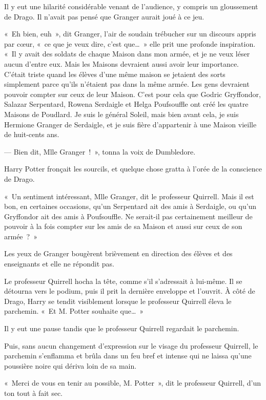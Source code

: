 Il y eut une hilarité considérable venant de l'audience, y compris un gloussement de Drago. Il n'avait pas pensé que Granger aurait joué à ce jeu.

«~Eh bien, euh~», dit Granger, l'air de soudain trébucher sur un discours appris par cœur, «~ce que je veux dire, c'est que…~» elle prit une profonde inspiration. «~Il y avait des soldats de chaque Maison dans mon armée, et je ne veux léser aucun d'entre eux. Mais les Maisons devraient aussi avoir leur importance. C'était triste quand les élèves d'une même maison se jetaient des sorts simplement parce qu'ils n'étaient pas dans la même armée. Les gens devraient pouvoir compter sur ceux de leur Maison. C'est pour cela que Godric Gryffondor, Salazar Serpentard, Rowena Serdaigle et Helga Poufsouffle ont créé les quatre Maisons de Poudlard. Je suis le général Soleil, mais bien avant cela, je suis Hermione Granger de Serdaigle, et je suis fière d'appartenir à une Maison vieille de huit-cents ans.

--- Bien dit, Mlle Granger~!~», tonna la voix de Dumbledore.

Harry Potter fronçait les sourcils, et quelque chose gratta à l'orée de la conscience de Drago.

«~Un sentiment intéressant, Mlle Granger, dit le professeur Quirrell. Mais il est bon, en certaines occasions, qu'un Serpentard ait des amis à Serdaigle, ou qu'un Gryffondor ait des amis à Poufsouffle. Ne serait-il pas certainement meilleur de pouvoir à la fois compter sur les amis de sa Maison et aussi sur ceux de son armée~?~»

Les yeux de Granger bougèrent brièvement en direction des élèves et des enseignants et elle ne répondit pas.

Le professeur Quirrell hocha la tête, comme s'il s'adressait à lui-même. Il se détourna vers le podium, puis il prit la dernière enveloppe et l'ouvrit. À côté de Drago, Harry se tendit visiblement lorsque le professeur Quirrell éleva le parchemin. «~Et M. Potter souhaite que…~»

Il y eut une pause tandis que le professeur Quirrell regardait le parchemin.

Puis, sans aucun changement d'expression sur le visage du professeur Quirrell, le parchemin s'enflamma et brûla dans un feu bref et intense qui ne laissa qu'une poussière noire qui dériva loin de sa main.

«~Merci de vous en tenir au possible, M. Potter~», dit le professeur Quirrell, d'un ton tout à fait sec.


